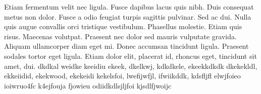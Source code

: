 \documentclass[a4paper,12pt]{book}
\begin{document}
Etiam fermentum velit nec ligula. Fusce dapibus lacus quis nibh. Duis
consequat metus non dolor. Fusce a odio feugiat turpis sagittis
pulvinar. Sed ac dui. Nulla quis augue convallis orci tristique
vestibulum. Phasellus molestie. Etiam quis risus. Maecenas
volutpat. Praesent nec dolor sed mauris vulputate gravida. Aliquam
ullamcorper diam eget mi. Donec accumsan tincidunt ligula. Praesent
sodales tortor eget ligula. Etiam dolor elit, placerat id, rhoncus
eget, tincidunt sit amet, dui. dkdkal weidke keeidiu ekeek, dkelkwj, 
kdkdkele, ekeekkdkdk dkekekldl, ekkeiidid, ekekwood, ekekeidi
kekelsfoi, lwefijwfjl, ifwiikddk, kdsfljfl elwjfoieo ioiwruo4fc
k4ejfouja fjowieu odiidkdlsjljfoi kjsdlfjwoijc
\end{document}
